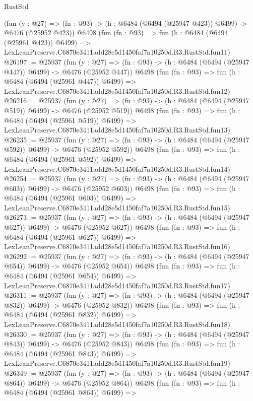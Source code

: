 \begin{lexlean}{RustStd}
\begin{coremodule}
    (fun (y : @27) => (fn : @93) -> (h : @6484 (@6494 (@25947 @423)) @6499) -> @6476 (@25952 @423))
    @6498
    (fun (fn : @93) =>
    fun (h : @6484 (@6494 (@25961 @423)) @6499) =>
    LexLeanPreserve.C6870e3411add28e5d1450faf7a10250d.R3.RustStd.fun11)
@26197 := @25937
    (fun (y : @27) => (fn : @93) -> (h : @6484 (@6494 (@25947 @447)) @6499) -> @6476 (@25952 @447))
    @6498
    (fun (fn : @93) =>
    fun (h : @6484 (@6494 (@25961 @447)) @6499) =>
    LexLeanPreserve.C6870e3411add28e5d1450faf7a10250d.R3.RustStd.fun12)
@26216 := @25937
    (fun (y : @27) => (fn : @93) -> (h : @6484 (@6494 (@25947 @519)) @6499) -> @6476 (@25952 @519))
    @6498
    (fun (fn : @93) =>
    fun (h : @6484 (@6494 (@25961 @519)) @6499) =>
    LexLeanPreserve.C6870e3411add28e5d1450faf7a10250d.R3.RustStd.fun13)
@26235 := @25937
    (fun (y : @27) => (fn : @93) -> (h : @6484 (@6494 (@25947 @592)) @6499) -> @6476 (@25952 @592))
    @6498
    (fun (fn : @93) =>
    fun (h : @6484 (@6494 (@25961 @592)) @6499) =>
    LexLeanPreserve.C6870e3411add28e5d1450faf7a10250d.R3.RustStd.fun14)
@26254 := @25937
    (fun (y : @27) => (fn : @93) -> (h : @6484 (@6494 (@25947 @603)) @6499) -> @6476 (@25952 @603))
    @6498
    (fun (fn : @93) =>
    fun (h : @6484 (@6494 (@25961 @603)) @6499) =>
    LexLeanPreserve.C6870e3411add28e5d1450faf7a10250d.R3.RustStd.fun15)
@26273 := @25937
    (fun (y : @27) => (fn : @93) -> (h : @6484 (@6494 (@25947 @627)) @6499) -> @6476 (@25952 @627))
    @6498
    (fun (fn : @93) =>
    fun (h : @6484 (@6494 (@25961 @627)) @6499) =>
    LexLeanPreserve.C6870e3411add28e5d1450faf7a10250d.R3.RustStd.fun16)
@26292 := @25937
    (fun (y : @27) => (fn : @93) -> (h : @6484 (@6494 (@25947 @654)) @6499) -> @6476 (@25952 @654))
    @6498
    (fun (fn : @93) =>
    fun (h : @6484 (@6494 (@25961 @654)) @6499) =>
    LexLeanPreserve.C6870e3411add28e5d1450faf7a10250d.R3.RustStd.fun17)
@26311 := @25937
    (fun (y : @27) => (fn : @93) -> (h : @6484 (@6494 (@25947 @832)) @6499) -> @6476 (@25952 @832))
    @6498
    (fun (fn : @93) =>
    fun (h : @6484 (@6494 (@25961 @832)) @6499) =>
    LexLeanPreserve.C6870e3411add28e5d1450faf7a10250d.R3.RustStd.fun18)
@26330 := @25937
    (fun (y : @27) => (fn : @93) -> (h : @6484 (@6494 (@25947 @843)) @6499) -> @6476 (@25952 @843))
    @6498
    (fun (fn : @93) =>
    fun (h : @6484 (@6494 (@25961 @843)) @6499) =>
    LexLeanPreserve.C6870e3411add28e5d1450faf7a10250d.R3.RustStd.fun19)
@26349 := @25937
    (fun (y : @27) => (fn : @93) -> (h : @6484 (@6494 (@25947 @864)) @6499) -> @6476 (@25952 @864))
    @6498
    (fun (fn : @93) =>
    fun (h : @6484 (@6494 (@25961 @864)) @6499) =>

\end{coremodule}
\end{lexlean}
